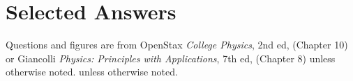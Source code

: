 \documentclass[10pt]{exam}
\def\theanswers{\theendnotes}
\begin{document}
\pagebreak

\newcommand{\refsheet}{
  \section*{Selected Answers}

  \renewcommand{\enotesize}{\normalsize}
  \renewcommand{\enoteformat}{%
    \leftskip=1.8em
    \makebox[0pt][r]{\theenmark. }%
  }

  \hfill
  \theanswers
}

\refsheet
 
\pagebreak


\noindent
Questions and figures are from OpenStax \emph{College Physics}, 2nd ed, (Chapter 10) or Giancolli \emph{Physics: Principles with Applications}, 7th ed, (Chapter 8) unless otherwise noted.
 unless otherwise noted.
\end{document}
